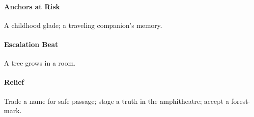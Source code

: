 \paragraph{Anchors at Risk} A childhood glade; a traveling companion’s memory.
\paragraph{Escalation Beat} A tree grows in a room.
\paragraph{Relief} Trade a name for safe passage; stage a truth in the amphitheatre; accept a forest-mark.


